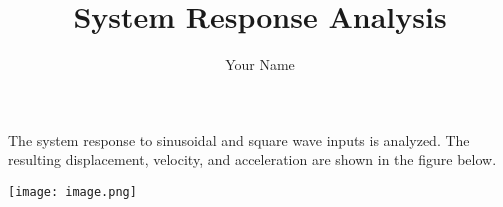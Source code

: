 \documentclass{article}
\title{System Response Analysis}
\author{Your Name}
\date{}
\begin{document}
\maketitle

The system response to sinusoidal and square wave inputs is analyzed. The resulting displacement, velocity, and acceleration are shown in the figure below.

\texttt{[image: image.png]}
\end{document}
